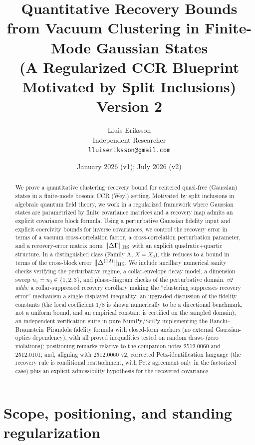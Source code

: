 \documentclass[11pt]{article}
\title{Quantitative Recovery Bounds from Vacuum Clustering in Finite-Mode
Gaussian States\\
{\large (A Regularized CCR Blueprint Motivated by Split Inclusions)}\\
{\normalsize Version 2}}
\author{Lluis Eriksson\\ Independent Researcher\\ \texttt{lluiseriksson@gmail.com}}
\date{January 2026 (v1); July 2026 (v2)}
\theoremstyle{remark}
\newcommand{\HS}{{\rm HS}}
\begin{document}
\maketitle

\begin{abstract}
We prove a quantitative clustering--recovery bound for centered quasi-free
(Gaussian) states in a finite-mode bosonic CCR (Weyl) setting. Motivated by
split inclusions in algebraic quantum field theory, we work in a regularized
framework where Gaussian states are parametrized by finite covariance
matrices and a recovery map admits an explicit covariance block formula.
Using a perturbative Gaussian fidelity input and explicit coercivity bounds
for inverse covariances, we control the recovery error in terms of a vacuum
cross-correlation factor, a cross-correlation perturbation parameter, and a
recovery-error matrix norm $\|\Delta\Gamma\|_\HS$ with an explicit
quadratic+quartic structure. In a distinguished class (Family A, $X = X_0$),
this reduces to a bound in terms of the cross-block error
$\|\Delta^{(12)}\|_\HS$. We include ancillary numerical sanity checks
verifying the perturbative regime, a collar-envelope decay model, a dimension
sweep $n_1 = n_2 \in \{1,2,3\}$, and phase-diagram checks of the perturbative
domain. \emph{v2 adds:} a collar-suppressed recovery corollary making the
``clustering suppresses recovery error'' mechanism a single displayed
inequality; an upgraded discussion of the fidelity constants (the local
coefficient $1/8$ is shown numerically to be a directional benchmark, not a
uniform bound, and an empirical constant is certified on the sampled
domain); an independent verification suite in pure NumPy/SciPy implementing
the Banchi--Braunstein--Pirandola fidelity formula with closed-form anchors
(no external Gaussian-optics dependency), with all proved inequalities
tested on random draws (zero violations); positioning remarks relative
to the companion notes 2512.0060 and 2512.0101; and, aligning with
2512.0060 v2, corrected Petz-identification language (the recovery rule is
conditional reattachment, with Petz agreement only in the factorized case)
plus an explicit admissibility hypothesis for the recovered covariance.
\end{abstract}

\tableofcontents

\section{Scope, positioning, and standing regularization}
\end{document}
